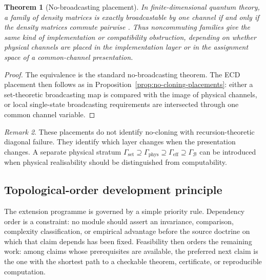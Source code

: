 \documentclass[11pt]{article}
\theoremstyle{plain}
\newtheorem{theorem}{Theorem}[section]
\theoremstyle{definition}
\theoremstyle{remark}
\newtheorem{remark}[theorem]{Remark}
\begin{document}
\begin{theorem}[No-broadcasting placement]
\label{thm:no-broadcasting-placement}
In finite-dimensional quantum theory, a family of density matrices is exactly
broadcastable by one channel if and only if the density matrices commute
pairwise \cite{nobroadcasting}. Thus noncommuting families give the same kind of
implementation or compatibility obstruction, depending on whether physical
channels are placed in the implementation layer or in the assignment space of a
common-channel presentation.
\end{theorem}

\begin{proof}
The equivalence is the standard no-broadcasting theorem. The ECD placement then
follows as in Proposition~\ref{prop:no-cloning-placements}: either a
set-theoretic broadcasting map is compared with the image of physical channels,
or local single-state broadcasting requirements are intersected through one
common channel variable.
\end{proof}

\begin{remark}
These placements do not identify no-cloning with recursion-theoretic diagonal
failure. They identify which layer changes when the presentation changes. A
separate physical stratum
$\Gamma_{\mathrm{set}}\supseteq\Gamma_{\mathrm{phys}}\supseteq
\Gamma_{\mathrm{eff}}\supseteq\Gamma_{\mathcal B}$
can be introduced when physical realisability should be distinguished from
computability.
\end{remark}

\subsection{Topological-order development principle}
\label{subsec:topological-development-principle}

The extension programme is governed by a simple priority rule. Dependency order
is a constraint: no module should assert an invariance, comparison, complexity
classification, or empirical advantage before the source doctrine on which that
claim depends has been fixed. Feasibility then orders the remaining work: among
claims whose prerequisites are available, the preferred next claim is the one
with the shortest path to a checkable theorem, certificate, or reproducible
computation.
\end{document}
